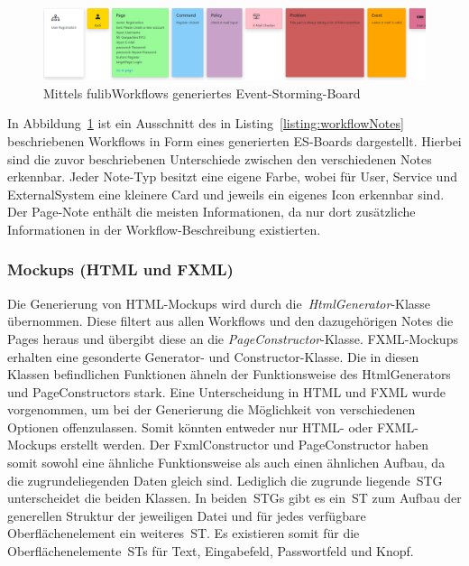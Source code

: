 \begin{figure}[h]
    \centering
    \includegraphics[width=1.0\textwidth]{images/3.1.4/board}
    \caption{Mittels fulibWorkflows generiertes Event-Storming-Board}
    \label{fig:generated-board}
\end{figure}

In Abbildung~\ref{fig:generated-board} ist ein Ausschnitt des in Listing~\ref{listing:workflowNotes} beschriebenen Workflows in
Form eines generierten \ac{ES}-Boards dargestellt.
Hierbei sind die zuvor beschriebenen Unterschiede zwischen den verschiedenen Notes erkennbar.
Jeder Note-Typ besitzt eine eigene Farbe, wobei für User, Service und ExternalSystem eine kleinere Card und jeweils ein
eigenes Icon erkennbar sind.
Der Page-Note enthält die meisten Informationen, da nur dort zusätzliche Informationen in der Workflow-Beschreibung existierten.

\subsubsection{Mockups (HTML und FXML)}\label{subsubsec:mockups-html/fxml}
Die Generierung von HTML-Mockups wird durch die~\textit{HtmlGenerator}-Klasse übernommen.
Diese filtert aus allen Workflows und den dazugehörigen Notes die Pages heraus und übergibt diese an die \textit{PageConstructor}-Klasse.
FXML-Mockups erhalten eine gesonderte Generator- und Constructor-Klasse.
Die in diesen Klassen befindlichen Funktionen ähneln der Funktionsweise des HtmlGenerators und PageConstructors stark.
Eine Unterscheidung in HTML und FXML wurde vorgenommen, um bei der Generierung die Möglichkeit von verschiedenen Optionen offenzulassen.
Somit könnten entweder nur HTML- oder FXML-Mockups erstellt werden.
Der FxmlConstructor und PageConstructor haben somit sowohl eine ähnliche Funktionsweise als auch einen ähnlichen Aufbau, da die zugrundeliegenden Daten gleich sind.
Lediglich die zugrunde liegende~\ac{STG} unterscheidet die beiden Klassen.
In beiden~\acp{STG} gibt es ein~\ac{ST} zum Aufbau der generellen Struktur der jeweiligen Datei und für jedes verfügbare Oberflächenelement ein weiteres~\ac{ST}.
Es existieren somit für die Oberflächenelemente~\acp{ST} für Text, Eingabefeld, Passwortfeld und Knopf.

